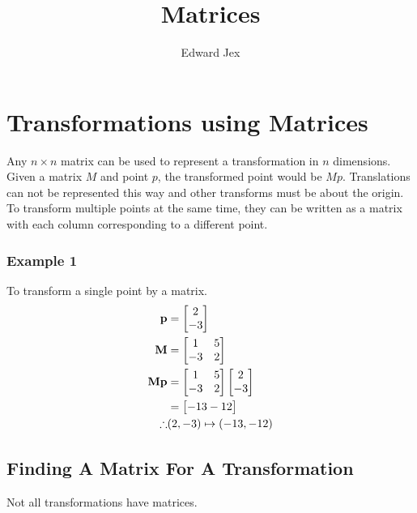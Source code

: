 \documentclass[a4paper,12pt]{article}
\begin{document}
\title{Matrices}	
\author{Edward Jex}
\maketitle
\section*{Transformations using Matrices}
Any $n \times n$ matrix can be used to represent a transformation in $n$ dimensions. Given a matrix $M$ and point $p$, the transformed point would be $Mp$. Translations can not be represented this way and other transforms must be about the origin. To transform multiple points at the same time, they can be written as a matrix with each column corresponding to a different point.
\subsubsection*{Example 1}
To transform a single point by a matrix. 
\begin{align*}
\bold{p} & = \begin{bmatrix} 2 \\ -3 \\ \end{bmatrix} \\
\bold{M} & = \begin{bmatrix} 
	1 & 5 \\
	-3 & 2 \\
\end{bmatrix} \\
\bold{Mp} & = \begin{bmatrix} 
	1 & 5 \\
	-3 & 2 \\
\end{bmatrix}
\begin{bmatrix} 2 \\ -3 \\ \end{bmatrix} \\
& = \begin{bmatrix} -13 -12 \end{bmatrix} \\
\therefore & (2, -3) \mapsto (-13, -12) \\
\end{align*}
\subsection*{Finding A Matrix For A Transformation}
Not all transformations have matrices. \\
\end{document}
